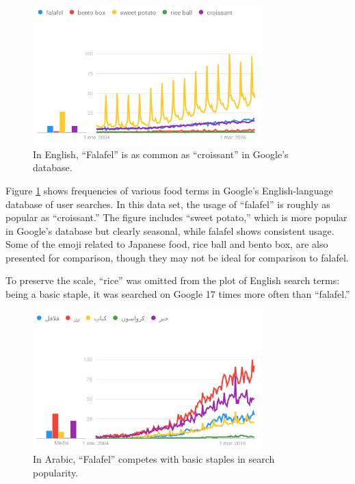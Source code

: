 \documentclass[a4paper,10pt]{article}
\begin{document}
\begin{figure}
\begin{center}
\includegraphics[width=3.5in]{trends.png}
\end{center}
\caption{In English, ``Falafel'' is as common as ``croissant'' in Google's database.}
\label{engplot}
\end{figure}


Figure \ref{engplot} shows frequencies of various food terms in Google's English-language
database of user searches.  In this data set, the usage of ``falafel'' is roughly as popular as
``croissant.'' 
The figure includes ``sweet potato,'' which is more popular
in Google's database but clearly seasonal, while falafel shows consistent usage.
Some of the emoji related to Japanese food, {\sc rice ball} and {\sc bento box}, are also
presented for comparison, though they may not be ideal for comparison to falafel.

To preserve the scale, ``rice'' was omitted from the plot of English search terms:
being a basic staple, it was searched on Google 17 times more often than ``falafel.''

\begin{figure}
\begin{center}
\includegraphics[width=3.5in]{atrends.png}
\end{center}
\caption{In Arabic, ``Falafel'' competes with basic staples in search popularity.}
\label{aplot}
\end{figure}
\end{document}
